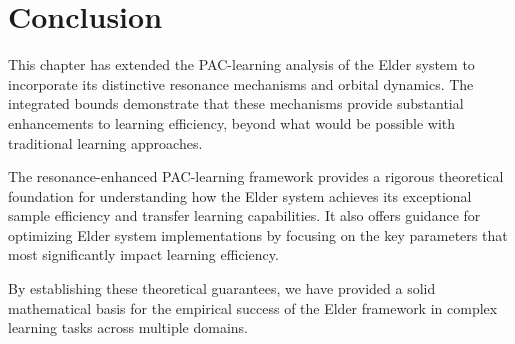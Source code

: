 \section{Conclusion}

This chapter has extended the PAC-learning analysis of the Elder system to incorporate its distinctive resonance mechanisms and orbital dynamics. The integrated bounds demonstrate that these mechanisms provide substantial enhancements to learning efficiency, beyond what would be possible with traditional learning approaches.

The resonance-enhanced PAC-learning framework provides a rigorous theoretical foundation for understanding how the Elder system achieves its exceptional sample efficiency and transfer learning capabilities. It also offers guidance for optimizing Elder system implementations by focusing on the key parameters that most significantly impact learning efficiency.

By establishing these theoretical guarantees, we have provided a solid mathematical basis for the empirical success of the Elder framework in complex learning tasks across multiple domains.